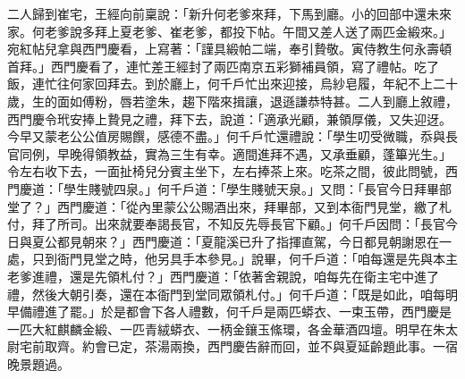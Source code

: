 二人歸到崔宅，王經向前稟說：「新升何老爹來拜，下馬到廳。小的回部中還未來家。何老爹說多拜上夏老爹、崔老爹，都投下帖。午間又差人送了兩匹金緞來。」宛紅帖兒拿與西門慶看，上寫著：「謹具緞帕二端，奉引贄敬。寅侍教生何永壽頓首拜。」西門慶看了，連忙差王經封了兩匹南京五彩獅補員領，寫了禮帖。吃了飯，連忙往何家回拜去。到於廳上，何千戶忙出來迎接，烏紗皂履，年紀不上二十歲，生的面如傅粉，唇若塗朱，趨下階來揖讓，退遜謙恭特甚。二人到廳上敘禮，西門慶令玳安捧上贄見之禮，拜下去，說道：「適承光顧，兼領厚儀，又失迎迓。今早又蒙老公公值房賜饌，感德不盡。」何千戶忙還禮說：「學生叨受微職，忝與長官同例，早晚得領教益，實為三生有幸。適間進拜不遇，又承垂顧，蓬篳光生。」令左右收下去，一面扯椅兒分賓主坐下，左右捧茶上來。吃茶之間，彼此問號，西門慶道：「學生賤號四泉。」何千戶道：「學生賤號天泉。」又問：「長官今日拜畢部堂了？」西門慶道：「從內里蒙公公賜酒出來，拜畢部，又到本衙門見堂，繳了札付，拜了所司。出來就要奉謁長官，不知反先辱長官下顧。」何千戶因問：「長官今日與夏公都見朝來？」西門慶道：「夏龍溪已升了指揮直駕，今日都見朝謝恩在一處，只到衙門見堂之時，他另具手本參見。」說畢，何千戶道：「咱每還是先與本主老爹進禮，還是先領札付？」西門慶道：「依著舍親說，咱每先在衛主宅中進了禮，然後大朝引奏，還在本衙門到堂同眾領札付。」何千戶道：「既是如此，咱每明早備禮進了罷。」於是都會下各人禮數，何千戶是兩匹蟒衣、一束玉帶，西門慶是一匹大紅麒麟金緞、一匹青絨蟒衣、一柄金鑲玉絛環，各金華酒四壇。明早在朱太尉宅前取齊。約會已定，茶湯兩換，西門慶告辭而回，並不與夏延齡題此事。一宿晚景題過。

